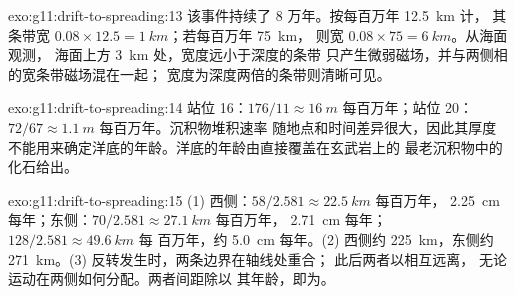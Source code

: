 \begin{solution}{exo:g11:drift-to-spreading:13}
该事件持续了 8 万年。按每百万年 \qty{12.5}{km} 计，
其条带宽 $0.08 \times 12.5 = \qty{1}{km}$；若每百万年 \qty{75}{km}，
则宽 $0.08 \times 75 = \qty{6}{km}$。从海面观测，
海面上方 \qty{3}{km} 处，宽度远小于深度的条带
只产生微弱磁场，并与两侧相的宽条带磁场混在一起；
宽度为深度两倍的条带则清晰可见。
\end{solution}

\begin{solution}{exo:g11:drift-to-spreading:14}
站位 16：$176/11 \approx \qty{16}{m}$ 每百万年；站位 20：$72/67
\approx \qty{1.1}{m}$ 每百万年。沉积物堆积速率
随地点和时间差异很大，因此其厚度
不能用来确定洋底的年龄。洋底的年龄由直接覆盖在玄武岩上的
最老沉积物中的化石给出。
\end{solution}

\begin{solution}{exo:g11:drift-to-spreading:15}
(1) 西侧：$58/2.581 \approx \qty{22.5}{km}$ 每百万年，
\qty{2.25}{cm} 每年；东侧：$70/2.581 \approx \qty{27.1}{km}$ 每百万年，
\qty{2.71}{cm} 每年； $128/2.581 \approx \qty{49.6}{km}$ 每
百万年，约 \qty{5.0}{cm} 每年。(2) 西侧约 \qty{225}{km}，东侧约
\qty{271}{km}。(3) 反转发生时，两条边界在轴线处重合；
此后两者以相互远离，
无论运动在两侧如何分配。两者间距除以
其年龄，即为。
\end{solution}

